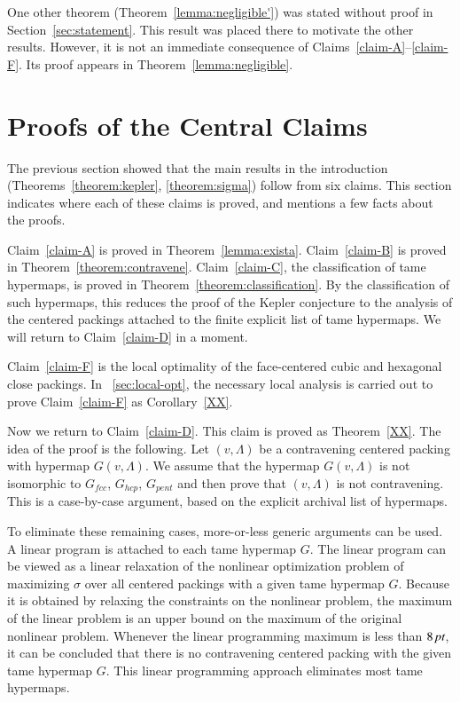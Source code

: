 \begin{remark}
One other theorem (Theorem~\ref{lemma:negligible'}) was stated
without proof in Section~\ref{sec:statement}.  This result was
placed there to motivate the other results.  However, it is not an
immediate consequence of Claims~\ref{claim-A}--\ref{claim-F}.  Its
proof appears in Theorem~\ref{lemma:negligible}.
\end{remark}

\section{Proofs of the Central Claims}

The previous section showed that the main results in the
introduction (Theorems~\ref{theorem:kepler}, \ref{theorem:sigma})
follow from six claims. This section indicates where each of these
claims is proved, and mentions a few facts about the proofs.

Claim~\ref{claim-A} is proved in Theorem~\ref{lemma:exista}.
Claim~\ref{claim-B} is proved in Theorem~\ref{theorem:contravene}.
Claim~\ref{claim-C}, the classification of tame hypermaps, is
proved in Theorem~\ref{theorem:classification}. By the
classification of such hypermaps, this reduces the proof of the
Kepler conjecture to the analysis of the centered packings
attached to the finite explicit list of tame hypermaps.  We will
return to Claim~\ref{claim-D} in a moment.

Claim~\ref{claim-F} is the local optimality of the face-centered
cubic and hexagonal close packings.   In
\Chap~\ref{sec:local-opt}, the necessary local analysis is carried
out to prove Claim~\ref{claim-F} as
Corollary~\ref{XX}.

Now we return to Claim~\ref{claim-D}. This claim is proved as
Theorem~\ref{XX}.  The idea of the proof is the
following.  Let $(v,\Lambda)$ be a contravening centered packing with
hypermap $G(v,\Lambda)$. We assume that the hypermap $G(v,\Lambda)$ is not
isomorphic to $G_{fcc}$, $G_{hcp}$, $G_{pent}$ and then prove that
$(v,\Lambda)$ is not contravening. This is a case-by-case argument, based on
the explicit archival list of hypermaps.

To eliminate these remaining cases, more-or-less generic arguments
can be used.  A linear program is attached to each tame hypermap
$G$. The linear program can be viewed as a linear relaxation of
the nonlinear optimization problem of maximizing $\sigma$ over all
centered packings with a given tame hypermap $G$. Because it is
obtained by relaxing the constraints on the nonlinear problem, the
maximum of the linear problem is an upper bound on the maximum of
the original nonlinear problem. Whenever the linear programming
maximum is less than $8\,\hbox{\it pt}$, it can be concluded that there is
no contravening centered packing with the given tame hypermap $G$.
This linear programming approach eliminates most tame hypermaps.

